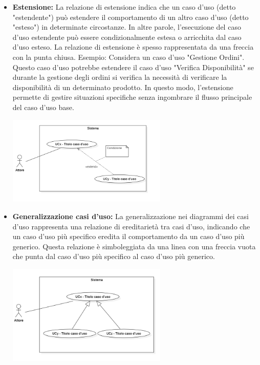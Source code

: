 \documentclass{article}
\begin{document}
\begin{itemize}
\begin{itemize}
        \item \textbf{Estensione:}
        La relazione di estensione indica che un caso d'uso (detto "estendente") può estendere il comportamento di un altro caso d'uso (detto "esteso") in determinate circostanze. In altre parole, l'esecuzione del caso d'uso estendente può essere condizionalmente estesa o arricchita dal caso d'uso esteso. La relazione di estensione è spesso rappresentata da una freccia con la punta chiusa.
        Esempio: Considera un caso d'uso "Gestione Ordini". Questo caso d'uso potrebbe estendere il caso d'uso "Verifica Disponibilità" se durante la gestione degli ordini si verifica la necessità di verificare la disponibilità di un determinato prodotto. In questo modo, l'estensione permette di gestire situazioni specifiche senza ingombrare il flusso principale del caso d'uso base.
        \begin{minipage}[t]{\linewidth}
            \centering
            \includegraphics[width=0.6\textwidth]{../Images/NormeDiProgetto/Estensione.PNG}
        \end{minipage}

        \item \textbf{Generalizzazione casi d'uso:}
        La generalizzazione nei diagrammi dei casi d'uso rappresenta una relazione di ereditarietà tra casi d'uso, indicando che un caso d'uso più specifico eredita il comportamento da un caso d'uso più generico. Questa relazione è simboleggiata da una linea con una freccia vuota che punta dal caso d'uso più specifico al caso d'uso più generico.
        \begin{minipage}[t]{\linewidth}
            \centering
            \includegraphics[width=0.6\textwidth]{../Images/NormeDiProgetto/GeneralizzazioneUC.PNG}
        \end{minipage}
    \end{itemize}

\end{itemize}
\end{document}
